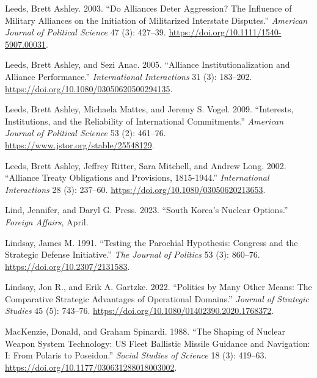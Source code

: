 \documentclass[
  12,
  letterpaper,
  DIV=11,
  numbers=noendperiod]{scrartcl}
\newlength{\cslhangindent}
\newlength{\cslentryspacingunit} %
\newenvironment{CSLReferences}[2] %
 {%
  \setlength{\parindent}{0pt}
  \ifodd #1
  \let\oldpar\par
  \def\par{\hangindent=\cslhangindent\oldpar}
  \fi
  \setlength{\parskip}{#2\cslentryspacingunit}
 }%
 {}
\begin{document}
\begin{CSLReferences}{1}{0}
\leavevmode{}%
Leeds, Brett Ashley. 2003. {``Do {Alliances Deter Aggression}? {The
Influence} of {Military Alliances} on the {Initiation} of {Militarized
Interstate Disputes}.''} \emph{American Journal of Political Science} 47
(3): 427--39. \url{https://doi.org/10.1111/1540-5907.00031}.

\leavevmode{}%
Leeds, Brett Ashley, and Sezi Anac. 2005. {``Alliance
{Institutionalization} and {Alliance Performance}.''}
\emph{International Interactions} 31 (3): 183--202.
\url{https://doi.org/10.1080/03050620500294135}.

\leavevmode{}%
Leeds, Brett Ashley, Michaela Mattes, and Jeremy S. Vogel. 2009.
{``Interests, {Institutions}, and the {Reliability} of {International
Commitments}.''} \emph{American Journal of Political Science} 53 (2):
461--76. \url{https://www.jstor.org/stable/25548129}.

\leavevmode{}%
Leeds, Brett Ashley, Jeffrey Ritter, Sara Mitchell, and Andrew Long.
2002. {``Alliance {Treaty Obligations} and {Provisions}, 1815-1944.''}
\emph{International Interactions} 28 (3): 237--60.
\url{https://doi.org/10.1080/03050620213653}.

\leavevmode{}%
Lind, Jennifer, and Daryl G. Press. 2023. {``South {Korea}'s {Nuclear
Options}.''} \emph{Foreign Affairs}, April.

\leavevmode{}%
Lindsay, James M. 1991. {``Testing the {Parochial Hypothesis}:
{Congress} and the {Strategic Defense Initiative}.''} \emph{The Journal
of Politics} 53 (3): 860--76. \url{https://doi.org/10.2307/2131583}.

\leavevmode{}%
Lindsay, Jon R., and Erik A. Gartzke. 2022. {``Politics by Many Other
Means: {The} Comparative Strategic Advantages of Operational Domains.''}
\emph{Journal of Strategic Studies} 45 (5): 743--76.
\url{https://doi.org/10.1080/01402390.2020.1768372}.

\leavevmode{}%
MacKenzie, Donald, and Graham Spinardi. 1988. {``The {Shaping} of
{Nuclear Weapon System Technology}: {US Fleet Ballistic Missile
Guidance} and {Navigation}: {I}: {From Polaris} to {Poseidon}.''}
\emph{Social Studies of Science} 18 (3): 419--63.
\url{https://doi.org/10.1177/030631288018003002}.


\end{CSLReferences}
\end{document}
